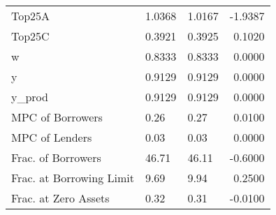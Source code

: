 \begin{table}
\begin{tabular}{lllr}
                  Top25A &  1.0368 &   1.0167 & -1.9387 \\
                  Top25C &  0.3921 &   0.3925 &  0.1020 \\
                       w &  0.8333 &   0.8333 &  0.0000 \\
                       y &  0.9129 &   0.9129 &  0.0000 \\
                  y\_prod &  0.9129 &   0.9129 &  0.0000 \\
        MPC of Borrowers &    0.26 &     0.27 &  0.0100 \\
          MPC of Lenders &    0.03 &     0.03 &  0.0000 \\
      Frac. of Borrowers &   46.71 &    46.11 & -0.6000 \\
Frac. at Borrowing Limit &    9.69 &     9.94 &  0.2500 \\
    Frac. at Zero Assets &    0.32 &     0.31 & -0.0100 \\
\bottomrule
\end{tabular}
\end{table}
